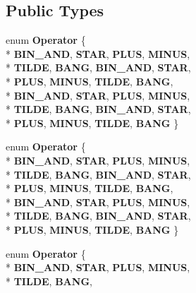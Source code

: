 \subsection*{Public Types}
\begin{DoxyCompactItemize}
\item 
enum {\bfseries Operator} \{ \\*
{\bfseries B\-I\-N\-\_\-\-A\-N\-D}, 
{\bfseries S\-T\-A\-R}, 
{\bfseries P\-L\-U\-S}, 
{\bfseries M\-I\-N\-U\-S}, 
\\*
{\bfseries T\-I\-L\-D\-E}, 
{\bfseries B\-A\-N\-G}, 
{\bfseries B\-I\-N\-\_\-\-A\-N\-D}, 
{\bfseries S\-T\-A\-R}, 
\\*
{\bfseries P\-L\-U\-S}, 
{\bfseries M\-I\-N\-U\-S}, 
{\bfseries T\-I\-L\-D\-E}, 
{\bfseries B\-A\-N\-G}, 
\\*
{\bfseries B\-I\-N\-\_\-\-A\-N\-D}, 
{\bfseries S\-T\-A\-R}, 
{\bfseries P\-L\-U\-S}, 
{\bfseries M\-I\-N\-U\-S}, 
\\*
{\bfseries T\-I\-L\-D\-E}, 
{\bfseries B\-A\-N\-G}, 
{\bfseries B\-I\-N\-\_\-\-A\-N\-D}, 
{\bfseries S\-T\-A\-R}, 
\\*
{\bfseries P\-L\-U\-S}, 
{\bfseries M\-I\-N\-U\-S}, 
{\bfseries T\-I\-L\-D\-E}, 
{\bfseries B\-A\-N\-G}
 \}
\item 
enum {\bfseries Operator} \{ \\*
{\bfseries B\-I\-N\-\_\-\-A\-N\-D}, 
{\bfseries S\-T\-A\-R}, 
{\bfseries P\-L\-U\-S}, 
{\bfseries M\-I\-N\-U\-S}, 
\\*
{\bfseries T\-I\-L\-D\-E}, 
{\bfseries B\-A\-N\-G}, 
{\bfseries B\-I\-N\-\_\-\-A\-N\-D}, 
{\bfseries S\-T\-A\-R}, 
\\*
{\bfseries P\-L\-U\-S}, 
{\bfseries M\-I\-N\-U\-S}, 
{\bfseries T\-I\-L\-D\-E}, 
{\bfseries B\-A\-N\-G}, 
\\*
{\bfseries B\-I\-N\-\_\-\-A\-N\-D}, 
{\bfseries S\-T\-A\-R}, 
{\bfseries P\-L\-U\-S}, 
{\bfseries M\-I\-N\-U\-S}, 
\\*
{\bfseries T\-I\-L\-D\-E}, 
{\bfseries B\-A\-N\-G}, 
{\bfseries B\-I\-N\-\_\-\-A\-N\-D}, 
{\bfseries S\-T\-A\-R}, 
\\*
{\bfseries P\-L\-U\-S}, 
{\bfseries M\-I\-N\-U\-S}, 
{\bfseries T\-I\-L\-D\-E}, 
{\bfseries B\-A\-N\-G}
 \}
\item 
enum {\bfseries Operator} \{ \\*
{\bfseries B\-I\-N\-\_\-\-A\-N\-D}, 
{\bfseries S\-T\-A\-R}, 
{\bfseries P\-L\-U\-S}, 
{\bfseries M\-I\-N\-U\-S}, 
\\*
{\bfseries T\-I\-L\-D\-E}, 
{\bfseries B\-A\-N\-G}, 

\end{DoxyCompactItemize}
